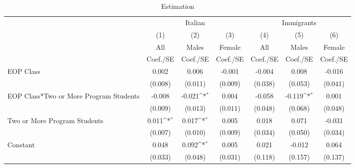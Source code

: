 \begin{table}[htbp]\centering
\def\sym#1{\ifmmode^{#1}\else\(^{#1}\)\fi}
\caption{Estimation \label{peer\_fail}}
\begin{tabular}{l*{6}{c}}
\toprule
                    &\multicolumn{3}{c}{Italian}                                      &\multicolumn{3}{c}{Immigrants}                                   \\\cmidrule(lr){2-4}\cmidrule(lr){5-7}
                    &\multicolumn{1}{c}{(1)}&\multicolumn{1}{c}{(2)}&\multicolumn{1}{c}{(3)}&\multicolumn{1}{c}{(4)}&\multicolumn{1}{c}{(5)}&\multicolumn{1}{c}{(6)}\\
                    &\multicolumn{1}{c}{All}&\multicolumn{1}{c}{Males}&\multicolumn{1}{c}{Female}&\multicolumn{1}{c}{All}&\multicolumn{1}{c}{Males}&\multicolumn{1}{c}{Female}\\
                    &    Coef./SE         &    Coef./SE         &    Coef./SE         &    Coef./SE         &    Coef./SE         &    Coef./SE         \\
\midrule
EOP Class           &       0.002         &       0.006         &      -0.001         &      -0.004         &       0.008         &      -0.016         \\
                    &     (0.008)         &     (0.011)         &     (0.009)         &     (0.038)         &     (0.053)         &     (0.041)         \\
EOP Class*Two or More Program Students&      -0.008         &      -0.021\sym{*}  &       0.004         &      -0.058         &      -0.119\sym{*}  &       0.001         \\
                    &     (0.009)         &     (0.013)         &     (0.011)         &     (0.048)         &     (0.068)         &     (0.048)         \\
Two or More Program Students&       0.011\sym{*}  &       0.017\sym{*}  &       0.005         &       0.018         &       0.071         &      -0.031         \\
                    &     (0.007)         &     (0.010)         &     (0.009)         &     (0.034)         &     (0.050)         &     (0.034)         \\
Constant            &       0.048         &       0.092\sym{*}  &       0.005         &       0.021         &      -0.012         &       0.064         \\
                    &     (0.033)         &     (0.048)         &     (0.031)         &     (0.118)         &     (0.157)         &     (0.137)         \\

\end{tabular}
\end{table}
